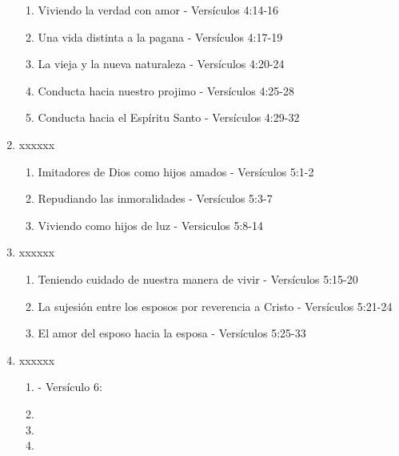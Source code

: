 \documentclass[9pt,letterpaper]{article}
\begin{document}
\begin{enumerate}
\begin{enumerate}
			\item Viviendo la verdad con amor - Versículos 4:14-16
			\item Una vida distinta a la pagana - Versículos 4:17-19
			\item La vieja y la nueva naturaleza - Versículos 4:20-24
			\item Conducta hacia nuestro projimo - Versículos 4:25-28
			\item Conducta hacia el Espíritu Santo - Versículos 4:29-32
		\end{enumerate}
		\item xxxxxx
		\begin{enumerate}
			\item Imitadores de Dios como hijos amados - Versículos 5:1-2
			\item Repudiando las inmoralidades - Versículos 5:3-7
			\item Viviendo como hijos de luz - Versiculos 5:8-14
			
		\end{enumerate}
		\item xxxxxx
		\begin{enumerate}
			\item Teniendo cuidado de nuestra manera de vivir - Versículos 5:15-20
			\item La sujesión entre los esposos por reverencia a Cristo - Versículos 5:21-24
			\item El amor del esposo hacia la esposa - Versículos 5:25-33
		\end{enumerate}
		\item xxxxxx 
		\begin{enumerate}
			\item  - Versículo 6:
			\item
			\item
			\item
		\end{enumerate}
		
	
	\end{enumerate}
\end{document}
